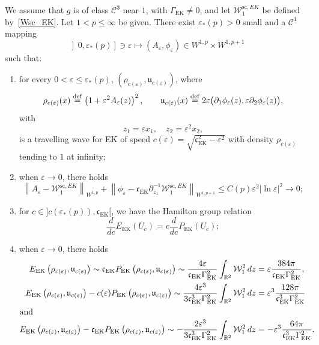 \documentclass[AHL,Unicode,longabstracts,published]{cedram}
\newcommand*\p{\partial}
\newcommand*\R{\mathbb R}
\newcommand*\ddef{\stackrel{\rm def}{=}}
\renewcommand{\sc}{\mathrm{sc}}
\newcommand{\EK}{\mathrm{EK}}
\newcommand*\BC{\mathcal{C}}
\newcommand*\BW{\mathcal{W}}
\newcommand*\cs{{\mathfrak c}}
\renewcommand*\u{\mathfrak{u}}
\newcommand*\ii{\infty}
\newcommand*\ls{\leqslant }
\newcommand*\e{\varepsilon}
\newcommand*\lne{\lvert \ln \varepsilon \rvert}
\newcommand*{\romanenumi}{\renewcommand*{\theenumi}{\roman{enumi}}}
\begin{document}
\begin{theo}\label{mainTH_EK}
We assume that $g$ is of class $ \BC^3 $ near $1 $, with $ \Gamma_{\EK} \neq 0 $, and let $ \BW_1^{\sc, EK} $ be defined by~\eqref{Wsc_EK}. Let $ 1 < p \ls \ii $ be given. There exist $ \e_* (p) > 0 $ small and a $ \BC^1 $ mapping
\[
\left] 0, \e_*(p)\right] \ni \e \mapsto (A_\e, \phi_\e) \in W^{1,p} \times W^{1,p+1}
\]
such that:
\begin{enumerate}\romanenumi
\item\label{theo.18.1} for every $ 0 < \e \ls \e_*(p) $, $ (\rho_{c(\e)}, \u_{c(\e)}) $, where
\[
\rho_{c(\e)} (x) \ddef \left(1 + \e^2 A_\e (z) \right)^2,
\qquad 
\u_{c(\e)} (x) \ddef 2 \e \big(\p_1 \phi_\e (z), \e \p_2 \phi_\e (z) \big),
\]
with
\[
z_1 = \e x_1, \quad z_2 = \e^2 x_2,
\]
is a travelling wave for EK of speed $ c(\e) = \sqrt{ \cs_{\EK}^2 - \e^2 } $ with density $ \rho_{c(\e)} $ tending to $1$ at infinity;

\item\label{theo.18.2} when $ \e \to 0 $, there holds
\[
\left\| A_\e - \BW_1^{\sc, EK} \right\|_{ W^{1,p} } + \left\| \phi_\e - \cs_{\EK} \p_{z_1}^{-1} \BW_1^{\sc,EK} \right\|_{W^{1,p+1} }
\ls C (p) \e^2 \lne^2 \to 0 ;
\]
\item\label{theo.18.3} for $ c \in] c(\e_*(p)), \cs_{\EK} [$, we have the Hamilton group relation
\[
\frac{d}{dc} E_{\EK} (U_c) = c \frac{d}{dc} P_{\EK}(U_c) ;
\]
\item\label{theo.18.4} when $ \e \to 0 $, there holds
\begin{align*}
E_{\EK} \left(\rho_{c(\e)}, \u_{c(\e)}\right)
\sim \cs_{\EK} P_{\EK} \left(\rho_{c(\e)}, \u_{c(\e)}\right)
\sim \frac{ 4 \e}{\cs_{\EK} \Gamma_{\EK}^2} \int_{\R^2} \BW_1^2 \, dz &= \e \frac{384 \pi}{\cs_{\EK} \Gamma_{\EK}^2},
\\
E_{\EK}\left(\rho_{c(\e)}, \u_{c(\e)}\right) - c(\e) P_{\EK} \left(\rho_{c(\e)}, \u_{c(\e)}\right)
\sim \frac{4 \e^3}{3 \cs_{\EK}^3 \Gamma_{\EK}^2} \int_{\R^2} \BW_1^2 \, dz &= \e^3 \frac{128\pi}{\cs_{\EK}^3 \Gamma_{\EK}^2}
\\
\intertext{and}
E_{\EK}\left(\rho_{c(\e)}, \u_{c(\e)}\right) - \cs_{\EK} P_{\EK} \left(\rho_{c(\e)}, \u_{c(\e)}\right)
\sim - \frac{2 \e^3}{3\cs_{\EK}^3 \Gamma_{\EK}^2} \int_{\R^2} \BW_1^2 \, dz &= - \e^3 \frac{64 \pi}{\cs_{\EK}^3 \Gamma_{\EK}^2}.
\end{align*}
\end{enumerate}
\end{theo}
\end{document}
